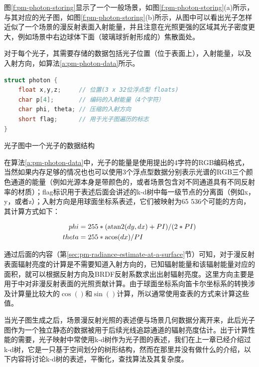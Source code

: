 图\ref{f:pm-photon-storing}显示了一个一般场景，如图\ref{f:pm-photon-storing}(a)所示，与其对应的光子图，如图\ref{f:pm-photon-storing}(b)所示，从图中可以看出光子怎样近似了一个场景的漫反射表面入射能量，并且注意在光照更强的区域其光子密度更大，例如场景中右边球体下面（玻璃球折射形成的）焦散面处。

对于每个光子，其需要存储的数据包括光子位置（位于表面上），入射能量，以及入射方向，如算法\ref{a:pm-photon-data}所示。

\begin{algorithm}
\begin{lstlisting}[language=C++, mathescape]
struct photon {
	float x,y,z;     // 位置(3 x 32位浮点型 floats)
	char p[4];       // 编码的入射能量（4个字符）
	char phi, theta; // 压缩的入射方向 
	short flag;      // 用于光子图遍历的标志
}
\end{lstlisting}
\caption{光子图中一个光子的数据结构}
\label{a:pm-photon-data}
\end{algorithm}

在算法\ref{a:pm-photon-data}中，光子的能量是使用\cite{a:Realpixels}提出的4字符的RGB编码格式，当然如果内存足够的情况也也可以使用3个浮点型数据分别表示光谱的RGB三个颜色通道的能量（例如光源本身是带颜色的，或者场景包含对不同通道具有不同反射率的材质）；flag标识用于表述后面会讲述的k-d树中每一级节点的分离面（例如x，y，或者z）；入射方向是用球面坐标系表述，它们被映射为65 536个可能的方向，其计算方式如下：

\begin{equation}
\begin{aligned}
	phi&=255*({\rm atan2}(dy,dx)+PI)/(2*PI)\\
	theta&=255*{\rm acos}(dx)/PI
\end{aligned}
\end{equation}

通过后面的内容（第\ref{sec:pm-radiance-estimate-at-a-surface}节）可知，对于漫反射表面辐射亮度的计算是不需要知道入射方向的，已知辐射能量和该辐射能量对应的面积，就可以根据反射方向及BRDF反射系数求出出射辐射亮度。这里方向主要是用于\cite{a:RenderingcausticsonnonLambertiansurfaces}中对非漫反射表面的光照贡献计算。由于球面坐标系向笛卡尔坐标系的转换涉及计算量比较大的$\cos()$和$\sin()$计算，所以通常使用查表的方式来计算这些值。

当光子图生成之后，场景漫反射光照的表述便与场景几何数据分离开来，此后光子图作为一个独立静态的数据被用于后续光线追踪通道的辐射亮度估计。出于计算性能的需要，光子映射中常使用k-d树作为光子图的表述，我们在上一章已经介绍过k-d树，它是一只基于空间划分的树形结构，然而在那里并没有做什么的介绍，以下内容将讨论k-d树的表述，平衡化，查找算法及其复杂度。





